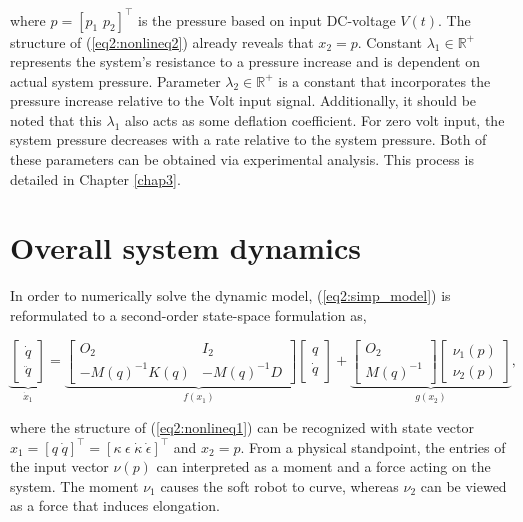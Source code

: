 where $p =  [p_1 \hspace{4pt} p_2]^\top$ is the pressure based on input DC-voltage $V(t)$. The structure of (\ref{eq2:nonlineq2}) already reveals that $x_2 = p$. Constant $\lambda_1 \in \mathbb{R}^+$ represents the system's resistance to a pressure increase and is dependent on actual system pressure. Parameter $\lambda_2 \in \mathbb{R}^+$ is a constant that incorporates the pressure increase relative to the Volt input signal. Additionally, it should be noted that this $\lambda_1$ also acts as some deflation coefficient. For zero volt input, the system pressure decreases with a rate relative to the system pressure. Both of these parameters can be obtained via experimental analysis. This process is detailed in Chapter \ref{chap3}.







\section{Overall system dynamics}


In order to numerically solve the dynamic model,  (\ref{eq2:simp_model}) is reformulated to a second-order state-space formulation as,

\begin{equation}
    \underbrace{\begin{bmatrix}\dot{q}\\ \ddot{q}  \end{bmatrix}}_{\dot{x}_1}   = \underbrace{  \begin{bmatrix} O_{2} & I_{2} \\ -M(q)^{-1}K(q)  & -M(q)^{-1} D \end{bmatrix}   \begin{bmatrix} q \\ \dot{q} \end{bmatrix} }_{f(x_1)}  +      \underbrace{ \begin{bmatrix} O_{2} \\ M(q)^{-1}   \end{bmatrix}       \begin{bmatrix} \nu_1(p) \\ \nu_2(p)  
    \end{bmatrix} }_{g(x_2)}, 
    \label{eq4:SS}
\end{equation}

where the structure of (\ref{eq2:nonlineq1}) can be recognized with state vector $x_1 = [ q \hspace{3pt} \dot{q}   ]^\top =  [\kappa \hspace{3pt} \epsilon \hspace{3pt} \dot{\kappa}  \hspace{3pt} \dot{\epsilon}  ]^{\top}$ and $x_2 = p$. From a physical standpoint, the entries of the input vector $\nu(p)$ can interpreted as a moment and a force acting on the system. The moment $\nu_1$ causes the soft robot to curve, whereas $\nu_2$ can be viewed as a force that induces elongation.


